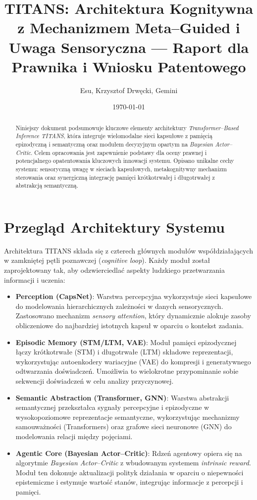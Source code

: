 \documentclass[12pt,a4paper]{article}
\title{TITANS: Architektura Kognitywna z Mechanizmem Meta–Guided i Uwaga Sensoryczna — Raport dla Prawnika i Wniosku Patentowego}
\author{Esu, Krzysztof Drwęcki, Gemini}
\date{\today}
\begin{document}
\maketitle

\begin{abstract}
Niniejszy dokument podsumowuje kluczowe elementy architektury \emph{Transformer–Based Inference TITANS}, która integruje wielomodalne sieci kapsułowe z pamięcią epizodyczną i semantyczną oraz modułem decyzyjnym opartym na \emph{Bayesian Actor–Critic}. Celem opracowania jest zapewnienie podstawy dla oceny prawnej i potencjalnego opatentowania kluczowych innowacji systemu. Opisano unikalne cechy systemu: sensoryczną uwagę w sieciach kapsułowych, metakognitywny mechanizm sterowania oraz synergiczną integrację pamięci krótkotrwałej i długotrwałej z abstrakcją semantyczną.\end{abstract}

\section{Przegląd Architektury Systemu}
Architektura TITANS składa się z czterech głównych modułów współdziałających w zamkniętej pętli poznawczej (\emph{cognitive loop}). Każdy moduł został zaprojektowany tak, aby odzwierciedlać aspekty ludzkiego przetwarzania informacji i uczenia:

\begin{itemize}
  \item \textbf{Perception (CapsNet)}: Warstwa percepcyjna wykorzystuje sieci kapsułowe do modelowania hierarchicznych zależności w danych sensorycznych. Zastosowano mechanizm \emph{sensory attention}, który dynamicznie alokuje zasoby obliczeniowe do najbardziej istotnych kapsuł w oparciu o kontekst zadania.
  \item \textbf{Episodic Memory (STM/LTM, VAE)}: Moduł pamięci epizodycznej łączy krótkotrwałe (STM) i długotrwałe (LTM) składowe reprezentacji, wykorzystując autoenkodery wariacyjne (VAE) do kompresji i generatywnego odtwarzania doświadczeń. Umożliwia to wielokrotne przypominanie sobie sekwencji doświadczeń w celu analizy przyczynowej.
  \item \textbf{Semantic Abstraction (Transformer, GNN)}: Warstwa abstrakcji semantycznej przekształca sygnały percepcyjne i epizodyczne w wysokopoziomowe reprezentacje semantyczne, wykorzystując mechanizmy samouważności (Transformers) oraz grafowe sieci neuronowe (GNN) do modelowania relacji między pojęciami.
  \item \textbf{Agentic Core (Bayesian Actor–Critic)}: Rdzeń agentowy opiera się na algorytmie \emph{Bayesian Actor–Critic} z wbudowanym systemem \emph{intrinsic reward}. Moduł ten dokonuje aktualizacji polityk działania w oparciu o niepewności epistemiczne i estymuje wartość stanów, integrując informacje z percepcji i pamięci.
\end{itemize}
\end{document}
